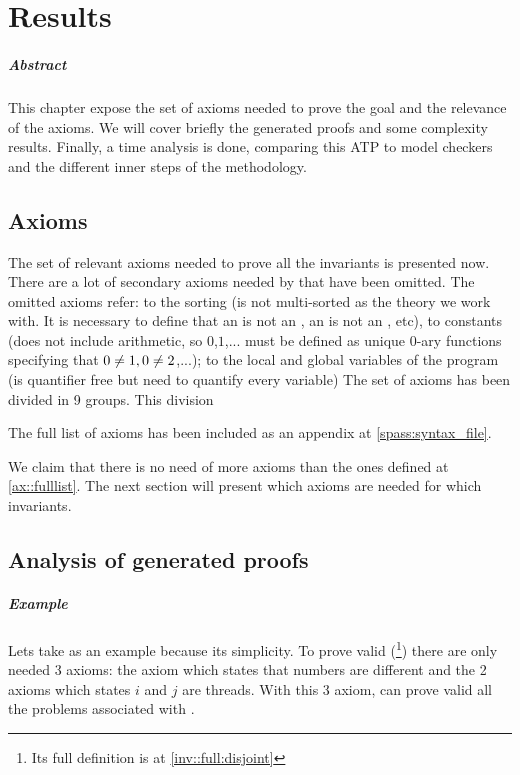 \chapter{Results\label{chap:results}}

\paragraph{Abstract}

This chapter expose the set of axioms needed to prove the goal and the relevance of the axioms.
%
We will cover briefly the generated proofs and some complexity results.
%
Finally, a time analysis is done, comparing this \gls{ATP} to model checkers and the different inner steps of the methodology.


\section{Axioms}

The set of relevant axioms needed to prove all the invariants is presented now.
%
There are a lot of secondary axioms needed by \spass that have been omitted. 
%
The omitted axioms refer: 
%
to the sorting (\spass is not multi-sorted as the theory we work with. It is necessary to define that an \addr is not an \elem, an \elem is not an \addr, etc), to constants (\spass does not include arithmetic, so $0$,$1$,... must be defined as unique 0-ary functions specifying that $0\not= 1,0\not= 2$,...); 
%
to the local and global variables of the program (\leap is quantifier free but \spass need to quantify every variable)
%
The set of axioms has been divided in 9 groups. 
%
This division 
		
\label{ax::fulllist}



The full list of axioms has been included as an appendix at \ref{spass:syntax_file}. 

%

We claim that there is no need of more axioms than the ones defined at \ref{ax::fulllist}. 
%
The next section will present which axioms are needed for which invariants.

\section{Analysis of generated proofs}
\label{proof:Preserve}
\label{sec:axiomgraph}

\paragraph{Example}
Lets take \invDisjoint as an example because its simplicity.
%
To prove \invDisjoint valid
%
(\footnote{Its full definition is at \ref{inv::full:disjoint}})
%
there are only needed 3 axioms: the axiom which states that numbers are different and the 2 axioms which states $i$ and $j$ are threads. 
%
With this 3 axiom, \spass can prove valid all the \spass problems associated with \invDisjoint.


